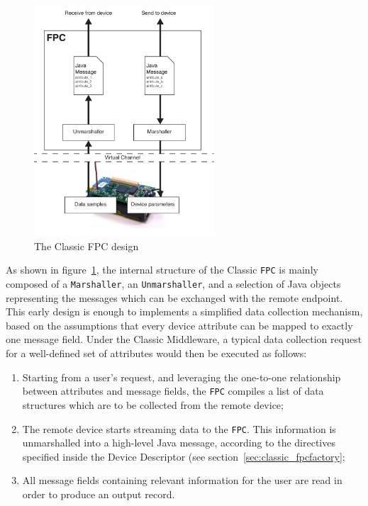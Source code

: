 \begin{figure}[h!]
\center
\includegraphics[width=0.6\textwidth]{imgs/classic_fpc.pdf}
\caption{The Classic FPC design}
\label{fig:classic_fpc}
\end{figure}

As shown in figure~\ref{fig:classic_fpc}, the internal structure of the Classic
\texttt{FPC} is mainly composed of a \texttt{Marshaller}, an
\texttt{Unmarshaller}, and a selection of Java objects representing the
messages which can be exchanged with the remote endpoint. This early design is
enough to implements a simplified data collection mechanism, based on the
assumptions that every device attribute can be mapped to exactly one message
field. Under the Classic Middleware, a typical data collection request for a
well-defined set of attributes would then be executed as follows:

\begin{enumerate}

    \item Starting from a user's request, and leveraging the one-to-one
        relationship between attributes and message fields, the \texttt{FPC}
        compiles a list of data structures which are to be collected from the
        remote device;

    \item The remote device starts streaming data to the \texttt{FPC}. This
        information is unmarshalled into a high-level Java message, according
        to the directives specified inside the Device Descriptor (see
        section~\ref{sec:classic_fpcfactory};

    \item All message fields containing relevant information for the user are
        read in order to produce an output record.

\end{enumerate}

